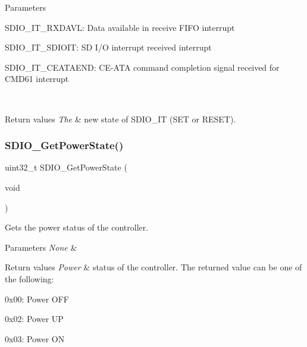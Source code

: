 \begin{DoxyParams}{Parameters}
\begin{DoxyItemize}
S\+D\+I\+O\+\_\+\+I\+T\+\_\+\+R\+X\+D\+A\+VL\+: Data available in receive F\+I\+FO interrupt \item S\+D\+I\+O\+\_\+\+I\+T\+\_\+\+S\+D\+I\+O\+IT\+: SD I/O interrupt received interrupt \item S\+D\+I\+O\+\_\+\+I\+T\+\_\+\+C\+E\+A\+T\+A\+E\+ND\+: C\+E-\/\+A\+TA command completion signal received for C\+M\+D61 interrupt \end{DoxyItemize}
\\
\hline
\end{DoxyParams}

\begin{DoxyRetVals}{Return values}
{\em The} & new state of S\+D\+I\+O\+\_\+\+IT (S\+ET or R\+E\+S\+ET). \\
\hline
\end{DoxyRetVals}
\mbox{\label{group___s_d_i_o___exported___functions_ga3a19de2c7cd51645702213f64a1758ed}} 
\subsubsection{\texorpdfstring{SDIO\_GetPowerState()}{SDIO\_GetPowerState()}}
{\footnotesize\ttfamily uint32\+\_\+t S\+D\+I\+O\+\_\+\+Get\+Power\+State (\begin{DoxyParamCaption}\item[{void}]{ }\end{DoxyParamCaption})}



Gets the power status of the controller. 


\begin{DoxyParams}{Parameters}
{\em None} & \\
\hline
\end{DoxyParams}

\begin{DoxyRetVals}{Return values}
{\em Power} & status of the controller. The returned value can be one of the following\+:
\begin{DoxyItemize}
\item 0x00\+: Power O\+FF
\item 0x02\+: Power UP
\item 0x03\+: Power ON 
\end{DoxyItemize}\\
\hline
\end{DoxyRetVals}
\mbox{\label{group___s_d_i_o___exported___functions_ga5c1e859511840e8cca6a9a768bce220b}} 
